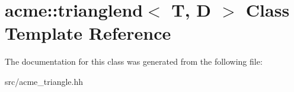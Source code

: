 \hypertarget{classacme_1_1trianglend}{}\section{acme\+:\+:trianglend$<$ T, D $>$ Class Template Reference}
\label{classacme_1_1trianglend}


The documentation for this class was generated from the following file\+:\begin{DoxyCompactItemize}
\item 
src/acme\+\_\+triangle.\+hh\end{DoxyCompactItemize}
